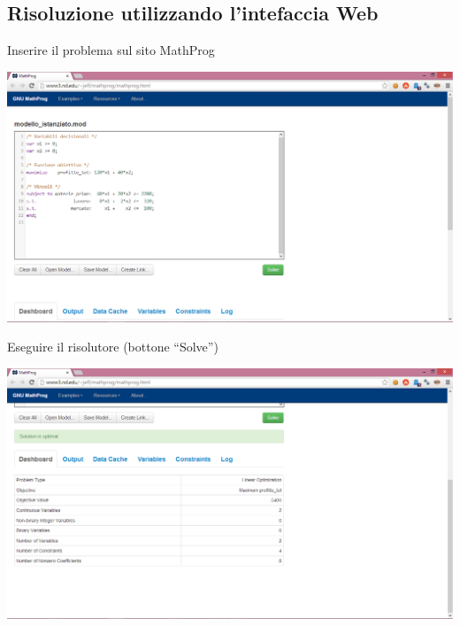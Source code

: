 \documentclass{beamer}
\begin{document}
\subsection{Risoluzione utilizzando l'intefaccia Web}

\begin{frame}{Inserire il problema sul sito MathProg}
\begin{center}
\includegraphics[height=0.85\textheight]{img/mathprog_jeff_1}
\par\end{center}
\end{frame}

\begin{frame}{Eseguire il risolutore (bottone ``Solve'')}
\begin{center}
\includegraphics[height=0.85\textheight]{img/mathprog_jeff_2}
\par\end{center}
\end{frame}
\end{document}
